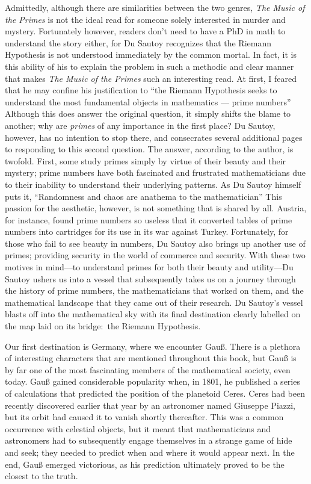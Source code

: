 \documentclass{mathbook}
\begin{document}
    Admittedly, although there are similarities between the two genres, \emph{The Music of the Primes} is not the ideal read for someone solely interested in murder and mystery. Fortunately however, readers don't need to have a PhD in math to understand the story either, for Du Sautoy  recognizes that the Riemann Hypothesis is not understood immediately by the common mortal. In fact, it is this ability of his to explain the problem in such a methodic and clear manner that makes \emph{The Music of the Primes} such an interesting read. At first, I feared that he may confine his justification to ``the Riemann Hypothesis seeks to understand the most fundamental objects in mathematics –– prime numbers'' \cite[p.~5]{Sautoy2003} Although this does answer the original question, it simply shifts the blame to another; why are \emph{primes} of any importance in the first place? Du Sautoy, however, has no intention to stop there, and consecrates several additional pages to responding to this second question. The answer, according to the author, is twofold. First, some study primes simply by virtue of their beauty and their mystery; prime numbers have both fascinated and frustrated mathematicians due to their inability to understand their underlying patterns. As Du Sautoy himself puts it, ``Randomness and chaos are anathema to the mathematician'' \cite[p.~7]{Sautoy2003} This passion for the aesthetic, however, is not something that is shared by all. Austria, for instance, found prime numbers so useless that it converted tables of prime numbers into cartridges for its use in its war against Turkey. \cite[p.~47]{Sautoy2003} Fortunately, for those who fail to see beauty in numbers, Du Sautoy also brings up another use of primes; providing security in the world of commerce and security. \cite[p.~11]{Sautoy2003} With these two motives in mind––to understand primes for both their beauty and utility––Du Sautoy ushers us into a vessel that subsequently takes us on a journey through the history of prime numbers, the mathematicians that worked on them, and the mathematical landscape that they came out of their research. Du Sautoy's vessel blasts off into the mathematical sky with its final destination clearly labelled on the map laid on its bridge:~the Riemann Hypothesis.
    
    Our first destination is Germany, where we encounter Gauß. There is a plethora of interesting characters that are mentioned throughout this book, but Gauß is by far one of the most fascinating members of the mathematical society, even today. Gauß gained considerable popularity when, in 1801, he published a series of calculations that predicted the position of the planetoid Ceres. \cite[p.~19]{Sautoy2003} Ceres had been recently discovered earlier that year by an astronomer named Giuseppe Piazzi, but its orbit had caused it to vanish shortly thereafter. This was a common occurrence with celestial objects, but it meant that mathematicians and astronomers had to subsequently engage themselves in a strange game of hide and seek; they needed to predict when and where it would appear next. In the end, Gauß emerged victorious, as his prediction ultimately proved to be the closest to the truth. \cite{Weiss1999} 
\end{document}

